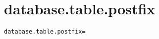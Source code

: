 \section{database.table.postfix}
\label{configuration:DatabaseTablePostfix}
\AvailableInJavaOnly{\TODO}
\begin{lstlisting}[style=Props,caption={Usage example for \textit{database.table.postfix}}]
database.table.postfix=
\end{lstlisting}